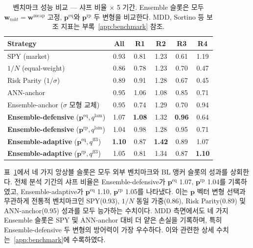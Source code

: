\documentclass{article}
\begin{document}
\begin{table}[ht]
\centering
\caption{벤치마크 성능 비교 — 샤프 비율 $\times$ 5 기간. Ensemble 슬롯은 모두 $\mathbf{w}_{mkt} = \mathbf{w}^{\mathrm{mcap}}$ 고정, $\mathbf{p}^{\mathrm{eq}}$와 $\mathbf{p}^{\mathrm{rp}}$ 두 변형을 비교한다. MDD, Sortino 등 보조 지표는 부록~\ref{app:benchmark} 참조.}
\label{tab:benchmark_sharpe}
\setlength{\tabcolsep}{6pt}
\renewcommand{\arraystretch}{1.15}
\small
\begin{tabular}{lccccc}
\toprule
Strategy & All & R1 & R2 & R3 & R4 \\
\midrule
SPY (market)                       & 0.93 & 0.81 & 1.23 & 0.61 & 1.19 \\
$1/N$ (equal-weight)               & 0.86 & 0.78 & 1.23 & 0.70 & 0.47 \\
Risk Parity ($1/\sigma$)           & 0.89 & 0.91 & 1.28 & 0.67 & 0.45 \\
ANN-anchor \citep{pyo2018}         & 0.95 & 1.06 & 1.08 & 0.85 & 0.71 \\
Ensemble-anchor ($\sigma$ 모형 교체) & 0.95 & 0.74 & 1.29 & 0.70 & 0.94 \\
\midrule
\textbf{Ensemble-defensive} ($\mathbf{p}^{\mathrm{eq}}, q^{\mathrm{lam}}$)
                                   & 1.07 & \textbf{1.08} & 1.32 & \textbf{0.96} & 0.64 \\
\textbf{Ensemble-defensive} ($\mathbf{p}^{\mathrm{rp}}, q^{\mathrm{lam}}$)
                                   & 1.04 & 0.98 & 1.28 & 0.95 & 0.71 \\
\textbf{Ensemble-adaptive} ($\mathbf{p}^{\mathrm{eq}}, q^{\mathrm{ff3}}$)
                                   & \textbf{1.10} & 0.87 & \textbf{1.42} & 0.89 & 1.07 \\
\textbf{Ensemble-adaptive} ($\mathbf{p}^{\mathrm{rp}}, q^{\mathrm{ff3}}$)
                                   & 1.05 & 0.81 & 1.34 & 0.87 & \textbf{1.10} \\
\bottomrule
\end{tabular}
\end{table}

표~\ref{tab:benchmark_sharpe}에서 네 가지 앙상블 슬롯은 모두 외부 벤치마크와 BL 앵커 슬롯의 성과를 상회한다. 전체 분석 기간의 샤프 비율은 Ensemble-defensive가 $\mathbf{p}^{\mathrm{eq}}$ 1.07, $\mathbf{p}^{\mathrm{rp}}$ 1.04를 기록하였고, Ensemble-adaptive가 $\mathbf{p}^{\mathrm{eq}}$ 1.10, $\mathbf{p}^{\mathrm{rp}}$ 1.05를 나타냈다. 이는 $\mathbf{p}$ 벡터 변형 선택과 무관하게 전통적 벤치마크인 SPY(0.93), $1/N$ 동일 가중(0.86), Risk Parity(0.89) 및 ANN-anchor(0.95) 성과를 모두 능가하는 수치이다. MDD 측면에서도 네 가지 Ensemble 슬롯은 SPY 및 ANN-anchor 대비 더 얕은 손실을 기록하며, 특히 Ensemble-defensive 두 변형의 방어력이 가장 우수하다. 이와 관련한 상세 수치는~\ref{app:benchmark}에 수록하였다.
\end{document}
